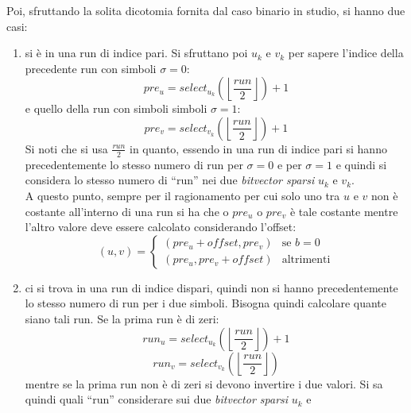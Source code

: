 \begin{enumerate}
  Poi, sfruttando la solita dicotomia fornita dal caso binario in studio, si
  hanno due casi: 
  \begin{enumerate}
    \item si è in una run di indice pari.
    Si sfruttano poi $u_k$ e $v_k$ per sapere l'indice della precedente run con
    simboli $\sigma=0$:
    \begin{equation}
      \label{eq:bv13}
      pre_u=select_{u_k}\left(\left\lfloor\frac{run}{2}\right\rfloor\right)+1
    \end{equation}
    e quello della run con simboli simboli $\sigma=1$:
    \begin{equation}
      \label{eq:bv14}
      pre_v=select_{v_k}\left(\left\lfloor\frac{run}{2}\right\rfloor\right)+1
    \end{equation}
    Si noti che si usa $\frac{run}{2}$ in quanto, essendo in una run di indice
    pari si hanno precedentemente lo stesso numero di run per $\sigma=0$ e per
    $\sigma=1$ e quindi si considera lo stesso numero di ``run'' nei due
    \textit{bitvector sparsi} $u_k$ e $v_k$.\\
    A questo punto, sempre per il ragionamento per cui solo uno tra $u$ e $v$
    non è costante all'interno di una run si ha che o $pre_u$ o $pre_v$ è tale
    costante mentre l'altro valore deve essere calcolato considerando l'offset:
    \begin{equation}
      \label{eq:bv15}
      (u,v)=
      \begin{cases}
        (pre_u+offset,pre_v)&\mbox{se } b=0\\
        (pre_u,pre_v+offset)&\mbox{altrimenti}
      \end{cases}
    \end{equation}
    \item ci si trova in una run di indice dispari, quindi non si hanno
    precedentemente lo stesso numero di run per i due simboli. Bisogna quindi
    calcolare quante siano tali run. Se la prima run è di zeri:
    \begin{equation}
      \label{eq:bv16}
      run_u=select_{u_k}\left(\left\lfloor\frac{run}{2}\right\rfloor\right)+1
    \end{equation}
    \begin{equation}
      \label{eq:bv17}
      run_v=select_{v_k}\left(\left\lfloor\frac{run}{2}\right\rfloor\right)
    \end{equation}
    mentre se la prima run non è di zeri si devono invertire i due valori. Si sa
    quindi quali ``run'' considerare sui due \textit{bitvector sparsi} $u_k$ e

\end{enumerate}
\end{enumerate}
